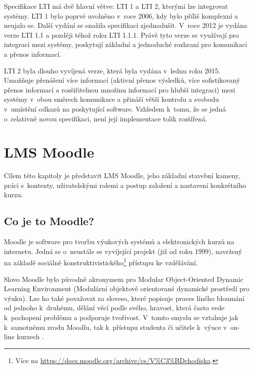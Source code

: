 \documentclass[
print,
  11pt,
  table,   
  nolof,    
  nolot,
  oneside,
  draft
]{fithesis3}
\begin{document}
Specifikace LTI má dvě hlavní větve: LTI 1 a LTI 2, kterými lze integrovat systémy. LTI 1 bylo poprvé uvolněno v~roce 2006, kdy bylo příliš komplexní a neujalo se. Další vydání se snažila specifikaci zjednodušit. V~roce 2012 je vydána verze LTI 1.1 a později téhož roku LTI 1.1.1. Právě tyto verze se využívají pro integraci mezi systémy, poskytují základní a jednoduché rozhraní pro komunikaci a přenos informací.

LTI 2 byla dlouho vyvíjená verze, která byla vydána v~lednu roku 2015. Umožňuje přenášení více informací (aktivní přenos výsledků, více sofistikovaný přenos informací a rozšiřitelnou množinu informací pro hlubší integraci) mezi systémy v~obou směrech komunikace a přináší větší kontrolu a svobodu v~umístění odkazů na poskytující software. Vzhledem k~tomu, že se jedná o~relativně novou specifikaci, není její implementace tolik rozšířená. \cite{imslti20}


\chapter{LMS Moodle}
Cílem této kapitoly je představit LMS Moodle, jeho základní stavební kameny, práci s~kontexty, uživatelskými rolemi  a postup založení a nastavení konkrétního kurzu.

	\section{Co je to Moodle?}

Moodle je software pro tvorbu výukových systémů a elektronických kurzů na internetu. Jedná se o~neustále se vyvíjející projekt (již od roku 1999), navržený na základě sociálně konstruktivistického\footnote{Více na \url{https://docs.moodle.org/archive/cs/V\%C3\%BDchodiska}.}  přístupu ke vzdělávání.  

Slovo Moodle bylo původně akronymem pro Modular Object-Oriented Dynamic Learning Environment (Modulární objektově orientované dynamické prostředí pro výuku). Lze ho také považovat za sloveso, které popisuje proces líného bloumání od jednoho k~druhému, dělání věcí podle svého, hravost, která často vede k~pochopení problému a podporuje tvořivost. V~tomto smyslu se vztahuje jak k~samotnému zrodu Moodlu, tak k~přístupu studenta či učitele k~výuce v~on-line kurzech \cite{moodle-what-is}. 
\end{document}
